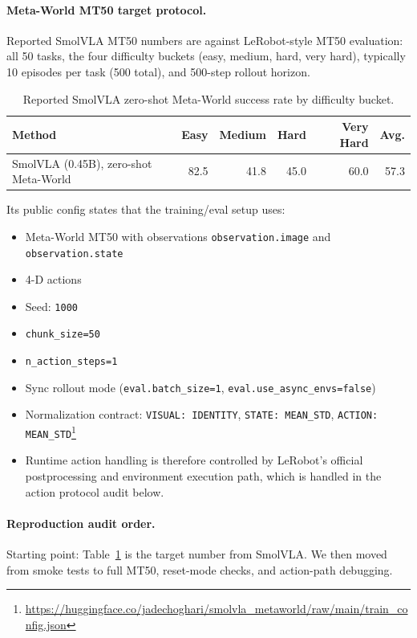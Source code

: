 \documentclass{article}
\begin{document}
\paragraph{Meta-World MT50 target protocol.}
Reported SmolVLA MT50 numbers are against LeRobot-style MT50 evaluation: all 50 tasks, the four difficulty buckets (easy, medium, hard, very hard), typically 10 episodes per task (500 total), and 500-step rollout horizon.

\begin{table}[H]
  \centering
  \begin{tabular}{lrrrrr}
    \toprule
    Method & Easy & Medium & Hard & Very Hard & Avg. \\
    \midrule
    SmolVLA (0.45B), zero-shot Meta-World & 82.5 & 41.8 & 45.0 & 60.0 & 57.3 \\
    \bottomrule
  \end{tabular}
  \caption{Reported SmolVLA zero-shot Meta-World success rate by difficulty bucket.}
  \label{tab:smolvla-metaworld-reported-zero-shot}
\end{table}

Its public config states that the training/eval setup uses:
\begin{itemize}
  \item Meta-World MT50 with observations \texttt{observation.image} and \texttt{observation.state}
  \item 4-D actions
  \item Seed: \texttt{1000}
  \item \texttt{chunk\_size=50}
  \item \texttt{n\_action\_steps=1}
  \item Sync rollout mode (\texttt{eval.batch\_size=1}, \texttt{eval.use\_async\_envs=false})
  \item Normalization contract: \texttt{VISUAL: IDENTITY}, \texttt{STATE: MEAN\_STD}, \texttt{ACTION: MEAN\_STD}\footnote{\url{https://huggingface.co/jadechoghari/smolvla_metaworld/raw/main/train_config.json}}
  \item Runtime action handling is therefore controlled by LeRobot's official postprocessing and environment execution path, which is handled in the action protocol audit below.
\end{itemize}


\paragraph{Reproduction audit order.}
Starting point: Table~\ref{tab:smolvla-metaworld-reported-zero-shot} is the target number from SmolVLA.  We then moved from smoke tests to full MT50, reset-mode checks, and action-path debugging.
\end{document}
